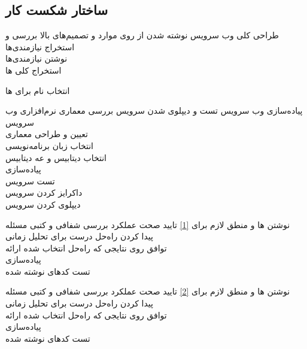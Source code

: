 \subsection{ساختار شکست کار}
\begin{wbsbox}{}

\begin{wbssub}
{طراحی کلی وب سرویس}
{نوشته شدن  از روی موارد و تصمیم‌های بالا}
بررسی و استخراج نیازمندی‌ها \\
\task
نوشتن نیازمندی‌ها \\
\task
استخراج کلی
ها

\task
انتخاب نام برای ها
\end{wbssub}

\begin{wbssub}
{پیاده‌سازی وب ‌سرویس}
{تست و دیپلوی شدن سرویس}
\task
بررسی معماری نرم‌افزاری وب سرویس \\
\task
تعیین و طراحی معماری \\
\task
انتخاب زبان برنامه‌نویسی \\
\task
انتخاب دیتابیس و  عه دیتابیس \\
\task
پیاده‌سازی \\
\task
تست سرویس \\
\task
داکرایز کردن سرویس \\
\task
دیپلوی کردن سرویس
\end{wbssub}

\begin{wbssub}
{نوشتن ها و منطق لازم برای \ref{1}}
{تایید صحت عملکرد}
\task 
بررسی شفافی و کتبی مسئله \\
\task
پیدا کردن راه‌حل درست برای تحلیل زمانی \\
\task
توافق روی نتایجی که راه‌حل انتخاب شده ارائه \\
\task
پیاده‌سازی \\
\task
تست کد‌‌های نوشته شده
\end{wbssub}

\begin{wbssub}
{نوشتن ها و منطق لازم برای \ref{2}}
{تایید صحت عملکرد}
\task 
بررسی شفافی و کتبی مسئله \\
\task
پیدا کردن راه‌حل درست برای تحلیل زمانی \\
\task
توافق روی نتایجی که راه‌حل انتخاب شده ارائه \\
\task
پیاده‌سازی \\
\task
تست کد‌‌های نوشته شده
\end{wbssub}


\end{wbsbox}
